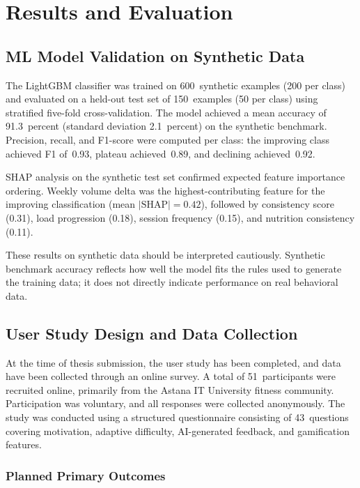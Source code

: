 \documentclass[12pt, a4paper]{report}
\begin{document}
\chapter{Results and Evaluation}
\label{ch:results}

\section{ML Model Validation on Synthetic Data}

The LightGBM classifier was trained on 600~synthetic examples (200 per class) and evaluated on a held-out test set of 150~examples (50 per class) using stratified five-fold cross-validation. The model achieved a mean accuracy of 91.3~percent (standard deviation 2.1~percent) on the synthetic benchmark. Precision, recall, and F1-score were computed per class: the improving class achieved F1 of~0.93, plateau achieved~0.89, and declining achieved~0.92.

SHAP analysis on the synthetic test set confirmed expected feature importance ordering. Weekly volume delta was the highest-contributing feature for the improving classification (mean $|\text{SHAP}| = 0.42$), followed by consistency score (0.31), load progression (0.18), session frequency (0.15), and nutrition consistency (0.11).

These results on synthetic data should be interpreted cautiously. Synthetic benchmark accuracy reflects how well the model fits the rules used to generate the training data; it does not directly indicate performance on real behavioral data.

\section{User Study Design and Data Collection}

At the time of thesis submission, the user study has been completed, and data have been collected through an online survey. A total of 51~participants were recruited online, primarily from the Astana IT University fitness community. Participation was voluntary, and all responses were collected anonymously. The study was conducted using a structured questionnaire consisting of 43~questions covering motivation, adaptive difficulty, AI-generated feedback, and gamification features.

\subsection{Planned Primary Outcomes}
\end{document}
